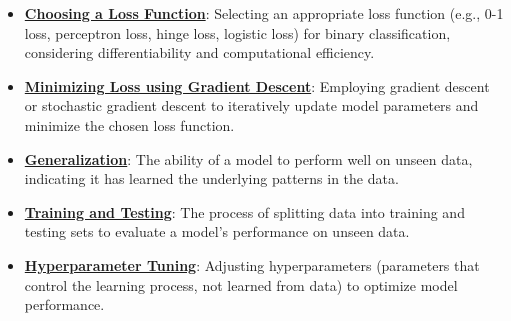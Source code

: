 \documentclass{article}%
\begin{document}
\begin{itemize}[leftmargin=*]
\item \href{https://purdue.brightspace.com/d2l/common/assets/pdfjs-d2l-dist/1.0.14-legacy/web/viewer.html?file=\%2Fcontent\%2Fenforced\%2F1095467-wl.202510.CS.24300.001\%2F05L2-ML Basics.pdf\%3Fou\%3D1095467\&lang=en-us\&container=d2l-fileviewer-rendered-pdf\&fullscreen=d2l-fileviewer-rendered-pdf-dialog\&height=667#page=25}{\textbf{Choosing a Loss Function}}: Selecting an appropriate loss function (e.g., 0-1 loss, perceptron loss, hinge loss, logistic loss) for binary classification, considering differentiability and computational efficiency.%
\item \href{https://purdue.brightspace.com/d2l/common/assets/pdfjs-d2l-dist/1.0.14-legacy/web/viewer.html?file=\%2Fcontent\%2Fenforced\%2F1095467-wl.202510.CS.24300.001\%2F05L2-ML Basics.pdf\%3Fou\%3D1095467\&lang=en-us\&container=d2l-fileviewer-rendered-pdf\&fullscreen=d2l-fileviewer-rendered-pdf-dialog\&height=667#page=28}{\textbf{Minimizing Loss using Gradient Descent}}: Employing gradient descent or stochastic gradient descent to iteratively update model parameters and minimize the chosen loss function.%
\item \href{https://purdue.brightspace.com/d2l/common/assets/pdfjs-d2l-dist/1.0.14-legacy/web/viewer.html?file=\%2Fcontent\%2Fenforced\%2F1095467-wl.202510.CS.24300.001\%2F10L1-CrossValidation.pdf\%3Fou\%3D1095467\&lang=en-us\&container=d2l-fileviewer-rendered-pdf\&fullscreen=d2l-fileviewer-rendered-pdf-dialog\&height=667#page=2}{\textbf{Generalization}}: The ability of a model to perform well on unseen data, indicating it has learned the underlying patterns in the data.%
\item \href{https://purdue.brightspace.com/d2l/common/assets/pdfjs-d2l-dist/1.0.14-legacy/web/viewer.html?file=\%2Fcontent\%2Fenforced\%2F1095467-wl.202510.CS.24300.001\%2F10L1-CrossValidation.pdf\%3Fou\%3D1095467\&lang=en-us\&container=d2l-fileviewer-rendered-pdf\&fullscreen=d2l-fileviewer-rendered-pdf-dialog\&height=667#page=5}{\textbf{Training and Testing}}: The process of splitting data into training and testing sets to evaluate a model's performance on unseen data.%
\item \href{https://purdue.brightspace.com/d2l/common/assets/pdfjs-d2l-dist/1.0.14-legacy/web/viewer.html?file=\%2Fcontent\%2Fenforced\%2F1095467-wl.202510.CS.24300.001\%2F10L1-CrossValidation.pdf\%3Fou\%3D1095467\&lang=en-us\&container=d2l-fileviewer-rendered-pdf\&fullscreen=d2l-fileviewer-rendered-pdf-dialog\&height=667#page=14}{\textbf{Hyperparameter Tuning}}: Adjusting hyperparameters (parameters that control the learning process, not learned from data) to optimize model performance.%

\end{itemize}
\end{document}
